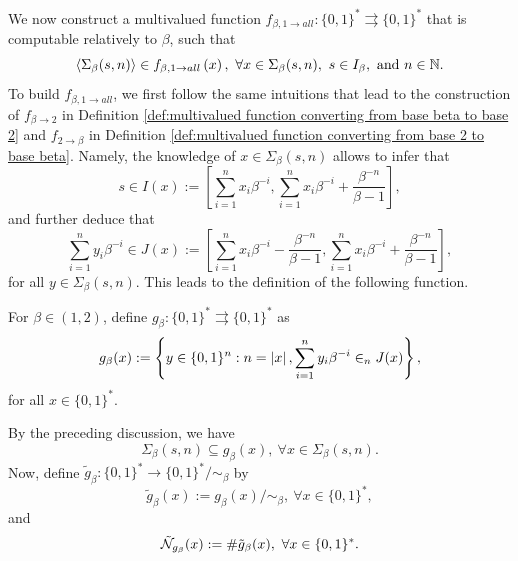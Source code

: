 We now construct a multivalued function $f_{\beta, 1 \to all} : \{0,1\}^\ast \rightrightarrows \{0,1\}^\ast$ that is computable relatively to $\beta$, such that
\begin{equation}
    \langle \Sigma_\beta(s,n) \rangle \in f_{\beta, 1 \to all}\left(x\right), \ \forall x \in \Sigma_\beta(s,n), \ s \in I_\beta, \ \text{and} \ n \in \mathbb{N}.
\end{equation}
To build $f_{\beta, 1 \to all}$, we first follow the same intuitions that lead to the construction of $f_{\beta \to 2}$ in Definition \ref{def:multivalued function converting from base beta to base 2} and $f_{2 \to \beta}$ in Definition \ref{def:multivalued function converting from base 2 to base beta}. Namely, the knowledge of $x \in \Sigma_\beta(s,n)$ allows to infer that
\begin{equation}
    s \in I(x) := \left[\sum_{i=1}^{n} x_i \beta^{-i},  \sum_{i=1}^{n} x_i \beta^{-i}+ \frac{\beta^{-n}}{\beta-1} \right],
\end{equation}
and further deduce that 
\begin{equation}
    \sum_{i=1}^n y_i \beta^{-i} \in J(x) := \left[\sum_{i=1}^{n} x_i \beta^{-i} - \frac{\beta^{-n}}{\beta-1},  \sum_{i=1}^{n} x_i \beta^{-i}+ \frac{\beta^{-n}}{\beta-1} \right],
\end{equation}
for all $y \in \Sigma_\beta(s,n)$. This leads to the definition of the following function.
\begin{definition}\label{def:definition of g beta to be all the beta sequences that are inside of an interval}
    For $\beta \in (1,2)$, define $g_\beta : \{0,1\}^\ast \rightrightarrows \{0,1\}^\ast$ as 
\begin{equation}
    g_\beta(x) := \left\{ y \in \{0,1\}^n : n = \left| x \right|,  \sum_{i=1}^n y_i \beta^{-i} \in_n J(x)\right\},
\end{equation}
for all $x \in \{0,1\}^\ast$.
\end{definition}
\noindent By the preceding discussion, we have
\begin{equation}\label{eq:Sigma beta s n is included in g beta x}
    \Sigma_\beta(s,n) \subseteq g_\beta(x), \ \forall x \in \Sigma_\beta(s,n).
\end{equation}
Now, define $\tilde g_\beta :  \{0,1\}^\ast \to \{0,1\}^\ast / \sim_\beta$ by
\begin{equation}
    \tilde g_\beta(x) := g_\beta(x)/ \sim_\beta, \ \forall x \in \{0,1\}^\ast,
\end{equation}
and
\begin{equation}
    \tilde {\mathcal{N}}_{g_\beta}(x) := \# \tilde g_\beta(x), \ \forall x \in \{0,1\}^\ast.
\end{equation}
